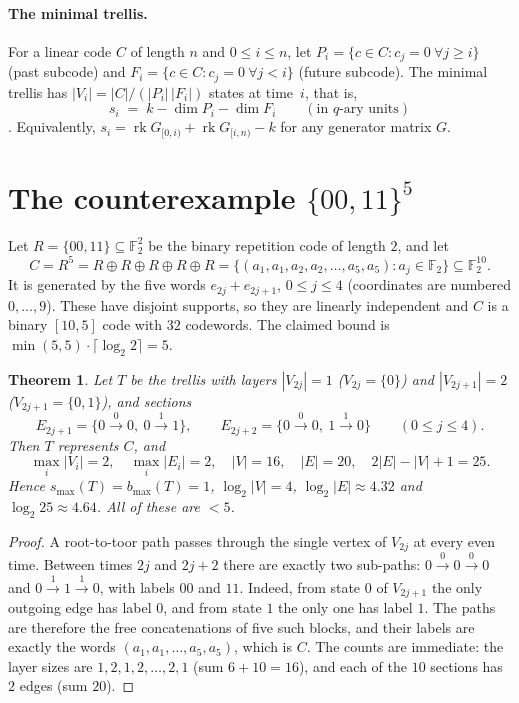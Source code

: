 \documentclass[11pt]{article}
\newtheorem{theorem}{Theorem}
\theoremstyle{definition}
\theoremstyle{remark}
\newcommand{\F}{\mathbb{F}}
\newcommand{\smax}{s_{\max}}
\begin{document}
\paragraph{The minimal trellis.} For a linear code $C$ of length $n$ and
$0\le i\le n$, let
$P_i=\{c\in C: c_j=0\ \forall j\ge i\}$ (past subcode) and
$F_i=\{c\in C: c_j=0\ \forall j<i\}$ (future subcode). The minimal trellis has
$|V_i|=|C|/(|P_i|\,|F_i|)$ states at time~$i$, that is,
\begin{equation}\label{eq:bcjr}
s_i\;=\;k-\dim P_i-\dim F_i\qquad(\text{in $q$-ary units})
\end{equation}
\cite{Forney,McEliece,Vardy}. Equivalently, $s_i=\operatorname{rk}G_{[0,i)}+\operatorname{rk}G_{[i,n)}-k$
for any generator matrix $G$.

\section{\texorpdfstring{The counterexample $\{00,11\}^5$}{The counterexample (00,11)\^{}5}}
Let $R=\{00,11\}\subseteq\F_2^2$ be the binary repetition code of length $2$, and let
\[
C=R^5=R\oplus R\oplus R\oplus R\oplus R
=\{(a_1,a_1,a_2,a_2,\dots,a_5,a_5): a_j\in\F_2\}\subseteq\F_2^{10}.
\]
It is generated by the five words $e_{2j}+e_{2j+1}$, $0\le j\le4$ (coordinates are
numbered $0,\dots,9$). These have disjoint supports, so they are linearly independent and
$C$ is a binary $[10,5]$ code with $32$ codewords. The claimed bound is
$\min(5,5)\cdot\lceil\log_2 2\rceil=5$.

\begin{theorem}\label{thm:main}
Let $T$ be the trellis with layers $|V_{2j}|=1$ ($V_{2j}=\{0\}$) and $|V_{2j+1}|=2$
($V_{2j+1}=\{0,1\}$), and sections
\[
E_{2j+1}=\{0\xrightarrow{0}0,\ 0\xrightarrow{1}1\},\qquad
E_{2j+2}=\{0\xrightarrow{0}0,\ 1\xrightarrow{1}0\}\qquad(0\le j\le 4).
\]
Then $T$ represents $C$, and
\[
\max_i|V_i|=2,\quad \max_i|E_i|=2,\quad |V|=16,\quad |E|=20,\quad 2|E|-|V|+1=25 .
\]
Hence $\smax(T)=b_{\max}(T)=1$, $\log_2|V|=4$, $\log_2|E|\approx4.32$ and
$\log_2 25\approx4.64$. All of these are $<5$.
\end{theorem}
\begin{proof}
A root-to-toor path passes through the single vertex of $V_{2j}$ at every even time.
Between times $2j$ and $2j+2$ there are exactly two sub-paths: $0\xrightarrow{0}0\xrightarrow{0}0$
and $0\xrightarrow{1}1\xrightarrow{1}0$, with labels $00$ and $11$. Indeed, from state $0$ of
$V_{2j+1}$ the only outgoing edge has label $0$, and from state $1$ the only one has
label $1$. The paths are therefore the free concatenations of five such blocks, and
their labels are exactly the words $(a_1,a_1,\dots,a_5,a_5)$, which is $C$. The counts
are immediate: the layer sizes are $1,2,1,2,\dots,2,1$ (sum $6+10=16$), and each of the
$10$ sections has $2$ edges (sum $20$).
\end{proof}
\end{document}
